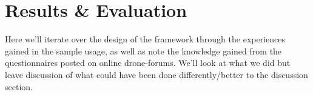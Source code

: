 \section{Results \& Evaluation}
Here we'll iterate over the design of the framework through the experiences gained in the sample usage, as well as note the knowledge gained from the questionnaires posted on online drone-forums. We'll look at what we did but leave discussion of what could have been done differently/better to the discussion section.